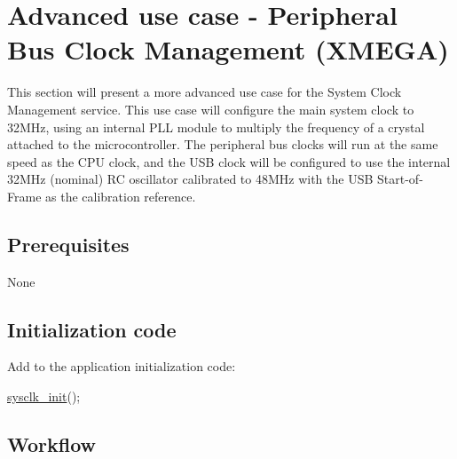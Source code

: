 \hypertarget{sysclk_quickstart_use_case_2_sysclk_quickstart_use_case_2}{}\section{Advanced use case -\/ Peripheral Bus Clock Management (\-X\-M\-E\-G\-A)}\label{sysclk_quickstart_use_case_2_sysclk_quickstart_use_case_2}
This section will present a more advanced use case for the System Clock Management service. This use case will configure the main system clock to 32\-M\-Hz, using an internal P\-L\-L module to multiply the frequency of a crystal attached to the microcontroller. The peripheral bus clocks will run at the same speed as the C\-P\-U clock, and the U\-S\-B clock will be configured to use the internal 32\-M\-Hz (nominal) R\-C oscillator calibrated to 48\-M\-Hz with the U\-S\-B Start-\/of-\/\-Frame as the calibration reference.\hypertarget{sysclk_quickstart_use_case_2_sysclk_quickstart_use_case_2_prereq}{}\subsection{Prerequisites}\label{sysclk_quickstart_use_case_2_sysclk_quickstart_use_case_2_prereq}

\begin{DoxyItemize}
\item None
\end{DoxyItemize}\hypertarget{sysclk_quickstart_use_case_2_sysclk_quickstart_use_case_2_setup_steps}{}\subsection{Initialization code}\label{sysclk_quickstart_use_case_2_sysclk_quickstart_use_case_2_setup_steps}
Add to the application initialization code\-: 
\begin{DoxyCode}
        \hyperlink{group__sysclk__group_ga242399e48a97739c88b4d0c00f6101de}{sysclk\_init}();
\end{DoxyCode}
\hypertarget{sysclk_quickstart_use_case_2_sysclk_quickstart_use_case_2_setup_steps_workflow}{}\subsection{Workflow}\label{sysclk_quickstart_use_case_2_sysclk_quickstart_use_case_2_setup_steps_workflow}

